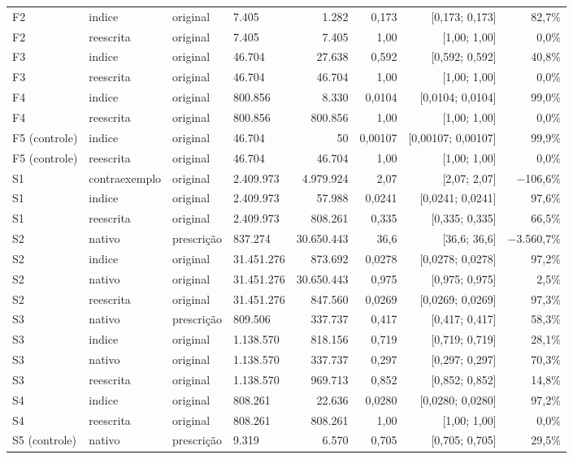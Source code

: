 {\begin{tabular}{llllrrrr}
F2 & indice & original & 7.405 & 1.282 & 0,173 & [0,173; 0,173] & 82,7\% \\
F2 & reescrita & original & 7.405 & 7.405 & 1,00 & [1,00; 1,00] & 0,0\% \\
F3 & indice & original & 46.704 & 27.638 & 0,592 & [0,592; 0,592] & 40,8\% \\
F3 & reescrita & original & 46.704 & 46.704 & 1,00 & [1,00; 1,00] & 0,0\% \\
F4 & indice & original & 800.856 & 8.330 & 0,0104 & [0,0104; 0,0104] & 99,0\% \\
F4 & reescrita & original & 800.856 & 800.856 & 1,00 & [1,00; 1,00] & 0,0\% \\
F5 (controle) & indice & original & 46.704 & 50 & 0,00107 & [0,00107; 0,00107] & 99,9\% \\
F5 (controle) & reescrita & original & 46.704 & 46.704 & 1,00 & [1,00; 1,00] & 0,0\% \\
S1 & contraexemplo & original & 2.409.973 & 4.979.924 & 2,07 & [2,07; 2,07] & $-$106,6\% \\
S1 & indice & original & 2.409.973 & 57.988 & 0,0241 & [0,0241; 0,0241] & 97,6\% \\
S1 & reescrita & original & 2.409.973 & 808.261 & 0,335 & [0,335; 0,335] & 66,5\% \\
S2 & nativo & prescrição & 837.274 & 30.650.443 & 36,6 & [36,6; 36,6] & $-$3.560,7\% \\
S2 & indice & original & 31.451.276 & 873.692 & 0,0278 & [0,0278; 0,0278] & 97,2\% \\
S2 & nativo & original & 31.451.276 & 30.650.443 & 0,975 & [0,975; 0,975] & 2,5\% \\
S2 & reescrita & original & 31.451.276 & 847.560 & 0,0269 & [0,0269; 0,0269] & 97,3\% \\
S3 & nativo & prescrição & 809.506 & 337.737 & 0,417 & [0,417; 0,417] & 58,3\% \\
S3 & indice & original & 1.138.570 & 818.156 & 0,719 & [0,719; 0,719] & 28,1\% \\
S3 & nativo & original & 1.138.570 & 337.737 & 0,297 & [0,297; 0,297] & 70,3\% \\
S3 & reescrita & original & 1.138.570 & 969.713 & 0,852 & [0,852; 0,852] & 14,8\% \\
S4 & indice & original & 808.261 & 22.636 & 0,0280 & [0,0280; 0,0280] & 97,2\% \\
S4 & reescrita & original & 808.261 & 808.261 & 1,00 & [1,00; 1,00] & 0,0\% \\
S5 (controle) & nativo & prescrição & 9.319 & 6.570 & 0,705 & [0,705; 0,705] & 29,5\% \\

\end{tabular}}
